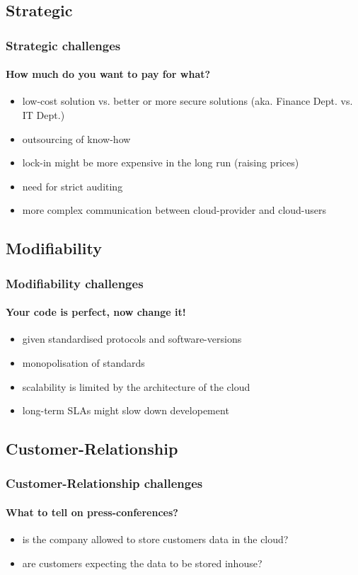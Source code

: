 \documentclass[]{beamer}
\begin{document}
\subsection{Strategic}

\begin{frame}
        \frametitle{Strategic challenges}
        \framesubtitle{How much do you want to pay for what?}
        \begin{itemize}
                \item low-cost solution vs. better or more secure solutions
                (aka. Finance Dept. vs. IT Dept.)
                \item outsourcing of know-how
                \item lock-in might be more expensive in the long run (raising
                prices)
                \item need for strict auditing
                \item more complex communication between cloud-provider and
                cloud-users
        \end{itemize}
\end{frame}

\subsection{Modifiability}

\begin{frame}
        \frametitle{Modifiability challenges}
        \framesubtitle{Your code is perfect, now change it!}
        \begin{itemize}
                \item given standardised protocols and software-versions
                \item monopolisation of standards
                \item scalability is limited by the architecture of the cloud
                \item long-term SLAs might slow down developement
        \end{itemize}
\end{frame}

\subsection{Customer-Relationship}

\begin{frame}
        \frametitle{Customer-Relationship challenges}
        \framesubtitle{What to tell on press-conferences?}
        \begin{itemize}
                \item is the company allowed to store customers data in the
                cloud?
                \item are customers expecting the data to be stored inhouse?
        \end{itemize}
\end{frame}
\end{document}
